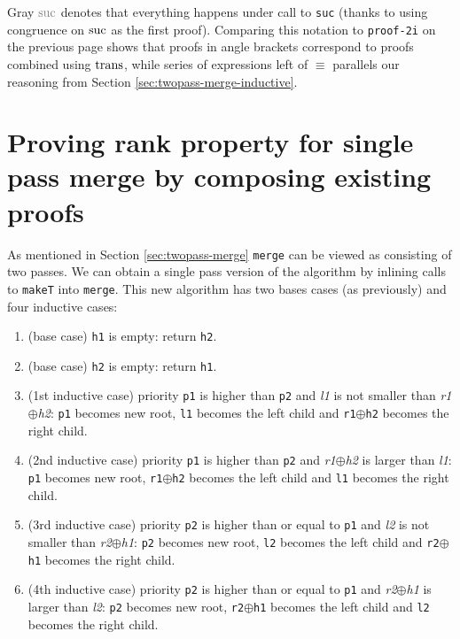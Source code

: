 \noindent
Gray ${\color{gray}\suc}$ denotes that everything happens under call to \texttt{suc} (thanks to using congruence on $\operatorname{suc}$ as the first proof). Comparing this notation to \texttt{proof-2i} on the previous page shows that proofs in angle brackets correspond to proofs combined using $\operatorname{trans}$, while series of expressions left of $≡$ parallels our reasoning from Section \ref{sec:twopass-merge-inductive}.

\section[Proving rank property for single pass merge by composing existing proofs]{Proving rank property for single pass merge by composing existing proofs} \label{sec:single-pass-merge-proof-by-comp}

As mentioned in Section \ref{sec:twopass-merge} \texttt{merge} can be viewed as consisting of two passes. We can obtain a single pass version of the algorithm by inlining calls to \texttt{makeT} into \texttt{merge}. This new algorithm has two bases cases (as previously) and four inductive cases:

\begin{enumerate}
 \item (base case) \texttt{h1} is empty: return \texttt{h2}.
 \item (base case) \texttt{h2} is empty: return \texttt{h1}.
 \item (1st inductive case) priority \texttt{p1} is higher than \texttt{p2} and \textit{l1} is not smaller than  \textit{r1}$\oplus$\textit{h2}: \texttt{p1} becomes new root, \texttt{l1} becomes the left child and \texttt{r1}$\oplus$\texttt{h2} becomes the right child.
 \item (2nd inductive case) priority \texttt{p1} is higher than \texttt{p2} and \textit{r1}$\oplus$\textit{h2} is larger than \textit{l1}: \texttt{p1} becomes new root, \texttt{r1}$\oplus$\texttt{h2} becomes the left child and \texttt{l1} becomes the right child.
 \item (3rd inductive case) priority \texttt{p2} is higher than or equal to \texttt{p1} and \textit{l2} is not smaller than  \textit{r2}$\oplus$\textit{h1}: \texttt{p2} becomes new root, \texttt{l2} becomes the left child and \texttt{r2}$\oplus$\texttt{h1} becomes the right child.
 \item (4th inductive case) priority \texttt{p2} is higher than or equal to \texttt{p1} and \textit{r2}$\oplus$\textit{h1} is larger than  \textit{l2}: \texttt{p2} becomes new root, \texttt{r2}$\oplus$\texttt{h1} becomes the left child and \texttt{l2} becomes the right child.
\end{enumerate}

